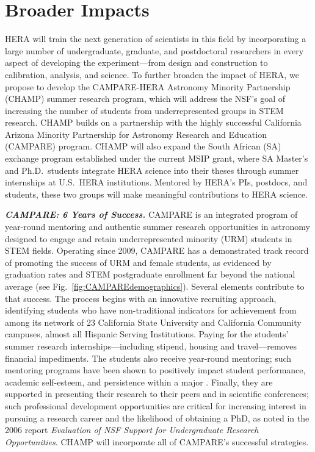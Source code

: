 \documentclass[preprint,11pt]{aastex}
\begin{document}
\section{Broader Impacts} \label{sec:BI}
\vspace{-5pt}


\noindent HERA will train the next generation of scientists in this field by incorporating a large number of undergraduate, graduate, and postdoctoral researchers in every aspect of developing the experiment---from design and construction to calibration, analysis, and science. To further broaden the impact of HERA, we propose to develop the CAMPARE-HERA Astronomy Minority Partnership (CHAMP) summer research program, which will address the NSF's goal of increasing the number of students from underrepresented groups in STEM research.  CHAMP builds on a partnership with the highly successful California Arizona Minority Partnership for Astronomy Research and Education (CAMPARE) program.  CHAMP will also expand the South African (SA) exchange program established under the current MSIP grant, where SA Master's and Ph.D.\ students integrate HERA science into their theses through summer internships at U.S.\ HERA institutions. Mentored by HERA's PIs, postdocs, and students, these two groups will make meaningful contributions to HERA science.

\emph{\textbf{CAMPARE: 6 Years of Success.}}
CAMPARE is an integrated program of year-round mentoring and authentic summer research opportunities in astronomy designed to engage and retain underrepresented minority (URM) students in STEM fields. Operating since 2009, CAMPARE has a demonstrated track record of promoting the success of URM and female students, as evidenced by graduation rates and STEM postgraduate enrollment far beyond the national average (see Fig.~\ref{fig:CAMPAREdemographics}).
Several elements contribute to that success.  The process begins with an innovative recruiting approach, identifying students who have non-traditional indicators for achievement from among its network of 23 California State University and California Community campuses, almost all Hispanic Serving Institutions.  Paying for the students' summer research internships---including stipend, housing and travel---removes financial impediments. The students also receive year-round mentoring; such mentoring programs have been shown to positively impact student performance, academic self-esteem, and persistence within a major \citep{2001.PSPB..27,2003.JWMSE...9}.  Finally, they are supported in presenting their research to their peers and in scientific conferences; such professional development opportunities are critical for 
increasing interest in pursuing a research career and the likelihood of obtaining a PhD, as noted in the 2006 report  \emph{Evaluation of NSF Support for Undergraduate Research Opportunities}.  CHAMP will incorporate all of CAMPARE's successful strategies.
\end{document}
